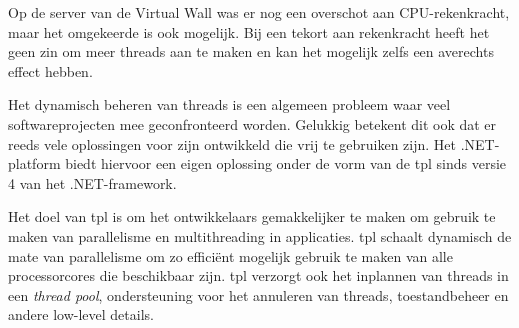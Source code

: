 Op de server van de Virtual Wall was er nog een overschot aan CPU-rekenkracht,
maar het omgekeerde is ook mogelijk.
Bij een tekort aan rekenkracht heeft het geen zin om meer threads aan te maken en kan het mogelijk zelfs een averechts effect hebben.

Het dynamisch beheren van threads is een algemeen probleem waar veel softwareprojecten mee geconfronteerd worden.
Gelukkig betekent dit ook dat er reeds vele oplossingen voor zijn ontwikkeld die vrij te gebruiken zijn.
Het .NET-platform biedt hiervoor een eigen oplossing onder de vorm van de \gls{tpl} sinds versie 4 van het .NET-framework.

Het doel van \gls{tpl} is om het ontwikkelaars gemakkelijker te maken om gebruik te maken van parallelisme en multithreading in applicaties.
\Gls{tpl} schaalt dynamisch de mate van parallelisme om zo efficiënt mogelijk gebruik te maken van alle processorcores die beschikbaar zijn.
\Gls{tpl} verzorgt ook het inplannen van threads in een \textit{thread pool}, ondersteuning voor het annuleren van threads, toestandbeheer en
andere low-level details\cite{msdn-tpl}.
